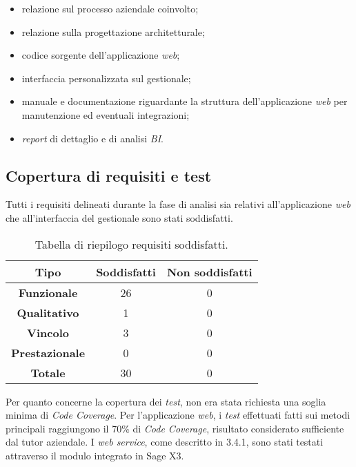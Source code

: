 \begin{itemize}
	\item relazione sul processo aziendale coinvolto;
	\item relazione sulla progettazione architetturale;
	\item codice sorgente dell'applicazione \textit{web};
	\item interfaccia personalizzata sul gestionale;
	\item manuale e documentazione riguardante la struttura dell'applicazione \textit{web} per manutenzione ed eventuali integrazioni;
	\item \textit{report} di dettaglio e di analisi \textit{BI}.
\end{itemize}


\subsection{Copertura di requisiti e test}

Tutti i requisiti delineati durante la fase di analisi sia relativi all'applicazione \textit{web} che all'interfaccia del gestionale sono stati soddisfatti.

\begin{center}
	\begin{longtable}{ | c| c | c|}
		\caption{Tabella di riepilogo requisiti soddisfatti.}\\		
		\hline
		\textbf{Tipo} & \textbf{Soddisfatti} & \textbf{Non soddisfatti} \\
		\hline
		\textbf{Funzionale} & 26 & 0 \\
		\hline
		\textbf{Qualitativo} & 1 & 0 \\
		\hline
		\textbf{Vincolo} & 3 & 0 \\
		\hline
		\textbf{Prestazionale} & 0 & 0 \\
		\hline
		\textbf{Totale} & 30 & 0 \\
		\hline
	\end{longtable}
\end{center}


Per quanto concerne la copertura dei \textit{test}, non era stata richiesta una soglia minima di \textit{Code Coverage}. Per l'applicazione \textit{web}, i \textit{test} effettuati fatti sui metodi principali raggiungono il 70\% di \textit{Code Coverage}, risultato considerato sufficiente dal tutor aziendale.
I \textit{web service}, come descritto in 3.4.1, sono stati testati attraverso il modulo integrato in Sage X3.

